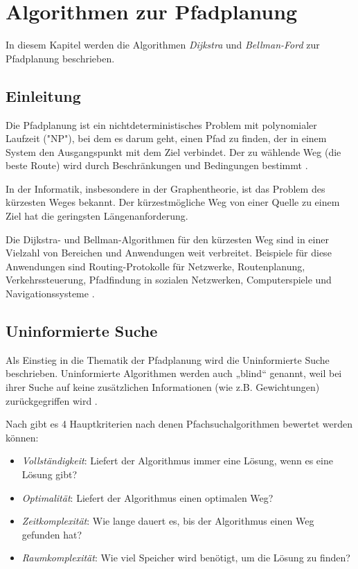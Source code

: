 \chapter{Algorithmen zur Pfadplanung}
In diesem Kapitel werden die Algorithmen \emph{Dijkstra} und \emph{Bellman-Ford} zur Pfadplanung beschrieben.

\section{Einleitung}
\label{Was ist Pfadplanung?}
Die Pfadplanung ist ein nichtdeterministisches Problem mit polynomialer Laufzeit ("NP"), bei dem es darum geht, einen Pfad zu finden, 
der in einem System den Ausgangspunkt mit dem Ziel verbindet. Der zu wählende Weg (die beste Route) wird durch Beschränkungen 
und Bedingungen bestimmt \cite{Karur:21}.

In der Informatik, insbesondere in der Graphentheorie, ist das Problem des kürzesten Weges bekannt. Der kürzestmögliche Weg von 
einer Quelle zu einem Ziel hat die geringsten Längenanforderung.

Die Dijkstra- und Bellman-Algorithmen für den kürzesten Weg sind in einer Vielzahl von Bereichen und Anwendungen
weit verbreitet. Beispiele für diese Anwendungen sind Routing-Protokolle für Netzwerke, Routenplanung, 
Verkehrssteuerung, Pfadfindung in sozialen Netzwerken, Computerspiele und Navigationssysteme \cite{Panda:18}.

\section{Uninformierte Suche}
\label{Uninformierte Suche}
Als Einstieg in die Thematik der Pfadplanung wird die Uninformierte Suche beschrieben.
Uninformierte Algorithmen werden auch „blind“ genannt, weil bei ihrer 
Suche auf keine zusätzlichen Informationen (wie z.B. Gewichtungen) zurückgegriffen wird \cite[80-82]{Russell:10}.

Nach \cite[80-82]{Russell:10} gibt es 4 Hauptkriterien nach denen Pfachsuchalgorithmen bewertet werden können:
\begin{itemize}
	\item \emph{Vollständigkeit}: Liefert der Algorithmus immer eine Lösung, wenn es eine Lösung gibt?
	\item \emph{Optimalität}: Liefert der Algorithmus einen optimalen Weg?
	\item \emph{Zeitkomplexität}: Wie lange dauert es, bis der Algorithmus einen Weg gefunden hat?
	\item \emph{Raumkomplexität}: Wie viel Speicher wird benötigt, um die Lösung zu finden?
\end{itemize}
\newpage
